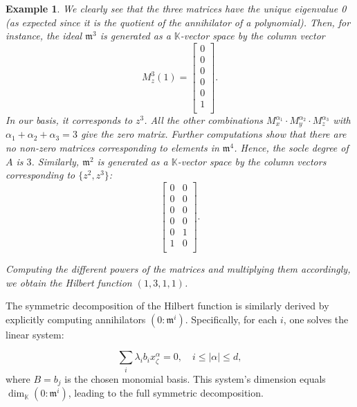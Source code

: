 \documentclass[a4paper,11p]{amsart}
\newcommand{\m}{\mathfrak m}
\newtheorem{example0}[defn0]{Example}
\newenvironment{example}{ \begin{example0}\rm}{\end{example0}}
\newcommand{\K}{\mathbb K}
\begin{document}
\begin{example}
We clearly see that the three matrices have the unique eigenvalue 0 (as expected since it is the quotient of the annihilator of a polynomial). Then, for instance, the ideal $\m^3$ is generated as a $\K$-vector space by the column vector
{\small{
\[M_z^3(1) =
\begin{bmatrix}
0 \\
0 \\
0 \\
0 \\
0 \\
1 \\
\end{bmatrix}.\]
}}
In our basis, it corresponds to $z^3$.
All the other combinations $M_x^{\alpha_1}\cdot M_y^{\alpha_2}\cdot M_z^{\alpha_3}$ with $\alpha_1+\alpha_2+\alpha_3=3$ give the zero matrix. 
Further computations show that there are no non-zero matrices corresponding to elements in $\m^4$. Hence, the socle degree of $A$ is $3$. Similarly, $\m^2$ is generated as a $\K$-vector space by the column vectors corresponding to $\{z^2,z^3\}$:
{\small{
\[
\begin{bmatrix}
0 & 0\\
0 & 0\\
0 & 0\\
0 & 0\\
0 & 1\\
1 & 0\\
\end{bmatrix}.\]}}


Computing the different powers of the matrices and multiplying them accordingly, we obtain the Hilbert function $(1,3,1,1)$. 
\end{example}

The symmetric decomposition of the Hilbert function is similarly derived by explicitly computing annihilators $(0:\m^{i})$. Specifically, for each $i$, one solves the linear system:


\begin{equation}\label{eq: annOfMax}
\sum_{i}\lambda_i b_i x_\zeta^{\alpha}=0, \quad i\leq |\alpha|\leq d,
\end{equation}
where $B={b_j}$ is the chosen monomial basis. This system's dimension equals $\dim_\K(0:\m^{i})$, leading to the full symmetric decomposition.
\end{document}
